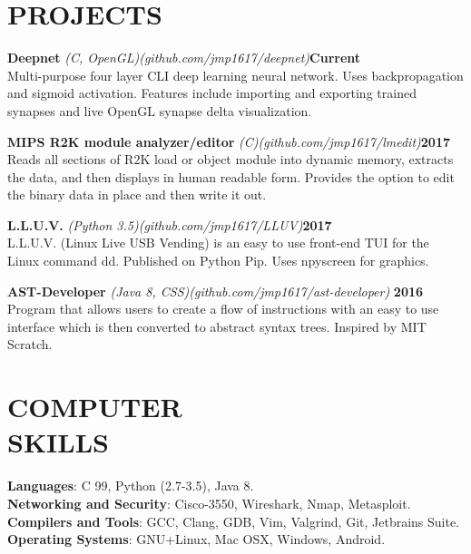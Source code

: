\documentclass[line,margin]{res}
\begin{document}
\begin{resume}
\section{PROJECTS}
\par
    {\textbf{Deepnet}}
    {\sl (C, OpenGL)}{\sl (github.com/jmp1617/deepnet)}\hfill \textbf{Current}\\ 
    Multi-purpose four layer CLI deep learning neural network. Uses
    backpropagation and sigmoid activation. Features include importing and 
    exporting trained synapses and live OpenGL synapse delta visualization.
\par
    {\textbf{MIPS R2K module analyzer/editor}}
    {\sl (C)}{\sl (github.com/jmp1617/lmedit)}\hfill \textbf{2017}\\
    Reads all sections of R2K load or object module into dynamic memory, 
    extracts the data, and then displays in human readable form. Provides the 
    option to edit the binary data in place and then write it out.
\par
    {\textbf{L.L.U.V.}}
    {\sl (Python 3.5)}{\sl (github.com/jmp1617/LLUV)}\hfill \textbf{2017}\\ 
    L.L.U.V. (Linux Live USB Vending) is an easy to use front-end TUI for the 
    Linux command dd. Published on Python Pip. Uses npyscreen for graphics.
\par
    {\textbf{AST-Developer}}
    {\sl (Java 8, CSS)}{\sl (github.com/jmp1617/ast-developer)}
    \hfill \textbf{2016}\\ 
    Program that allows users to create a flow of instructions with an easy to
    use interface which is then converted to abstract syntax trees. Inspired by 
    MIT Scratch.

\section{COMPUTER\\SKILLS}
\textbf{Languages}: C 99, Python (2.7-3.5), Java 8.
\\
\textbf{Networking and Security}: Cisco-3550, Wireshark, Nmap, Metasploit.  
\\
\textbf{Compilers and Tools}: GCC, Clang, GDB, Vim, Valgrind, Git, 
Jetbrains Suite. 
\\
\textbf{Operating Systems}: 
GNU+Linux, Mac OSX, Windows, Android.


\end{resume}
\end{document}
